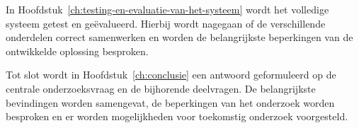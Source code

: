 In Hoofdstuk~\ref{ch:testing-en-evaluatie-van-het-systeem} wordt het volledige systeem getest en geëvalueerd. 
Hierbij wordt nagegaan of de verschillende onderdelen correct samenwerken en worden de belangrijkste 
beperkingen van de ontwikkelde oplossing besproken.

Tot slot wordt in Hoofdstuk~\ref{ch:conclusie} een antwoord geformuleerd op
de centrale onderzoeksvraag en de bijhorende deelvragen. De belangrijkste
bevindingen worden samengevat, de beperkingen van het onderzoek worden
besproken en er worden mogelijkheden voor toekomstig onderzoek voorgesteld.